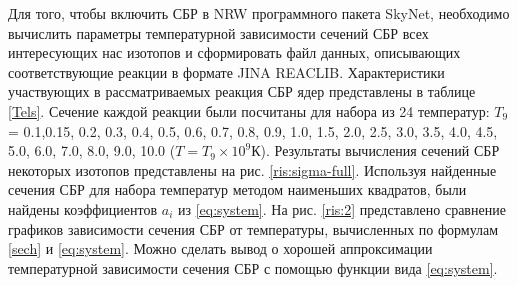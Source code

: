 \documentclass[14pt, a4paper]{article}
\begin{document}

Для того, чтобы включить СБР в NRW программного пакета SkyNet, необходимо вычислить параметры температурной зависимости сечений СБР всех интересующих нас изотопов и сформировать файл данных, описывающих соответствующие реакции в формате JINA REACLIB. Характеристики участвующих в рассматриваемых реакция СБР ядер представлены в таблице \ref{Tels}. Сечение каждой реакции были посчитаны для набора из 24 температур: $T_9$ = 0.1,0.15, 0.2, 0.3, 0.4, 0.5, 0.6, 0.7, 0.8, 0.9, 1.0, 1.5, 2.0, 2.5, 3.0, 3.5, 4.0, 4.5, 5.0, 6.0, 7.0, 8.0, 9.0, 10.0 ($T = T_9 \times 10^{9}\text{К}$). Результаты вычисления сечений СБР некоторых изотопов представлены на рис. \ref{ris:sigma-full}. Используя найденные сечения СБР для набора температур методом наименьших квадратов, были найдены коэффициентов $a_i$ из \eqref{eq:system}. На рис. \ref{ris:2} представлено сравнение графиков зависимости сечения СБР от температуры, вычисленных по формулам \eqref{sech} и \eqref{eq:system}. Можно сделать вывод о хорошей аппроксимации температурной зависимости сечения СБР с помощью функции вида \eqref{eq:system}.



\end{document}
